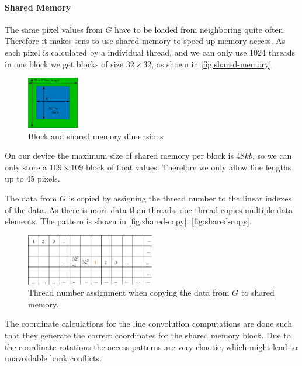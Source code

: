 \paragraph{Shared Memory}
The same pixel values from $G$ have to be loaded from neighboring quite often.
Therefore it makes sens to use shared memory to speed up memory access.
As each pixel is calculated by a individual thread, and we can only use 1024
threads in one block we get blocks of size $32\times32$, as shown in
\autoref{fig:shared-memory}

\begin{figure}[htb]
  \centering
  \includegraphics[width=0.2\textwidth]{images/shared-memory.png}
  \caption{Block and shared memory dimensions}
  \label{fig:shared-memory}
\end{figure}

On our device the maximum size of shared memory per block is $48kb$, so we can
only store a $109\times109$ block of float values. Therefore we only allow line
lengths up to 45 pixels.

The data from $G$ is copied by assigning the thread number to the linear
indexes of the data. As there is more data than threads, one thread copies
multiple data elements. The pattern is shown in \autoref{fig:shared-copy}.
\autoref{fig:shared-copy}.
\begin{figure}[htb]
  \centering
  \includegraphics[width=0.5\textwidth]{images/shared-copy.png}
  \caption{Thread number assignment when copying the data from $G$ to shared memory.}
  \label{fig:shared-copy}
\end{figure}

The coordinate calculations for the line convolution computations are done such
that they generate the correct coordinates for the shared memory block. Due to
the coordinate rotations the access patterns are very chaotic, which might lead
to unavoidable bank conflicts.

